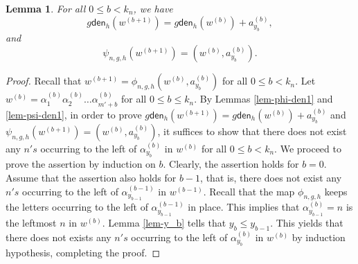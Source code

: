 \documentclass[12pt]{article}
\numberwithin{equation}{section}
\theoremstyle{plain}
\newtheorem{lemma}[theorem]{Lemma}
\def\den{\mathsf{den}}
\begin{document}
\begin{lemma}\label{lem-Phi-den1}
	For all $0\leq b<k_n$, we have $$
	g\den_{h}(w^{(b+1)})=g\den_{h}(w^{(b)})+a^{(b)}_{y_b},
	$$
	and 
	$$
	\psi_{n, g,h}(w^{(b+1)})=(w^{(b)}, a^{(b)}_{y_b}). 
	$$
	
	\end{lemma}
\begin{proof}
	Recall that $w^{(b+1)}=\phi_{n,g,h}(w^{(b)}, a^{(b)}_{y_{b}})$ for all $0\leq b<k_n$.   Let $w^{(b)}=\alpha^{(b)}_{1}\alpha^{(b)}_2\ldots \alpha^{(b)}_{m'+b}$ for all $0\leq b\leq k_n$.
By Lemmas \ref{lem-phi-den1} and \ref{lem-psi-den1}, 	in order to prove $
	g\den_{h}(w^{(b+1)})=g\den_{h}(w^{(b)})+a^{(b)}_{y_b}$ and $
	\psi_{n,g,h}(w^{(b+1)})=(w^{(b)}, a^{(b)}_{y_b})
	$, it suffices to show that  there does not exist  any $n's$ occurring to the left of $\alpha^{(b)}_{y_b}$ in $w^{(b)}$ for all  $0\leq b<k_n$.    We proceed to prove the assertion  by induction on $b$.  Clearly, the assertion holds for $b=0$.  Assume that the assertion also holds for $b-1$, that is,  there does not exist any $n's$ occurring to the left of $\alpha^{(b-1)}_{y_{b-1}}$ in $w^{(b-1)}$.  
	 Recall that  the map $\phi_{n,g,h}$ keeps the letters occurring to the left of $\alpha^{(b-1)}_{y_{b-1}}$ in place. 
	  This implies that $\alpha^{(b)}_{y_{b-1}}=n$ is the leftmost $n$ in $w^{(b)}$. 
	    Lemma \ref{lem-y_b} tells that $y_{b}\leq y_{b-1}$.  This yields  that there does not exists any $n's$ occurring to the left of $\alpha^{(b)}_{y_{b}}$ in $w^{(b)}$ by induction hypothesis, completing the proof.   
	
	
	
	  
	 
	
	\end{proof}
\end{document}
